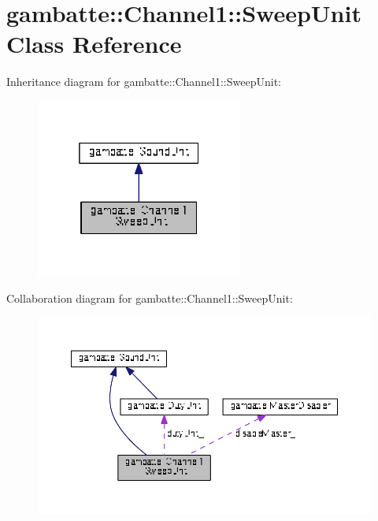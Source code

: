 \hypertarget{classgambatte_1_1Channel1_1_1SweepUnit}{}\section{gambatte\+:\+:Channel1\+:\+:Sweep\+Unit Class Reference}
\label{classgambatte_1_1Channel1_1_1SweepUnit}


Inheritance diagram for gambatte\+:\+:Channel1\+:\+:Sweep\+Unit\+:
\nopagebreak
\begin{figure}[H]
\begin{center}
\leavevmode
\includegraphics[width=193pt]{classgambatte_1_1Channel1_1_1SweepUnit__inherit__graph}
\end{center}
\end{figure}


Collaboration diagram for gambatte\+:\+:Channel1\+:\+:Sweep\+Unit\+:
\nopagebreak
\begin{figure}[H]
\begin{center}
\leavevmode
\includegraphics[width=350pt]{classgambatte_1_1Channel1_1_1SweepUnit__coll__graph}
\end{center}
\end{figure}
